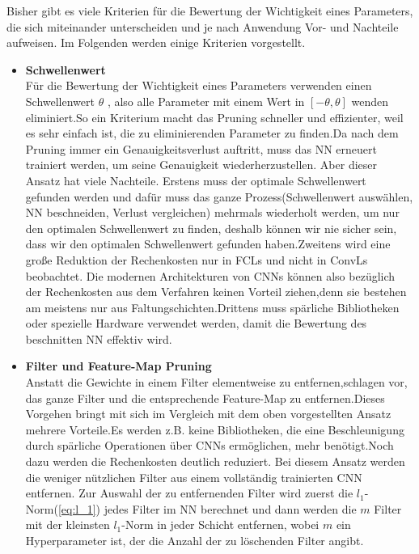 \documentclass[12pt,a4paper]{scrartcl}
\numberwithin{equation}{section}
\begin{document}
Bisher gibt es viele Kriterien für die Bewertung der Wichtigkeit eines Parameters, die sich miteinander unterscheiden und je nach Anwendung Vor- und Nachteile aufweisen. Im Folgenden werden einige Kriterien vorgestellt.
\begin{itemize}
		\item \textbf{Schwellenwert}\\
			Für die Bewertung der Wichtigkeit eines Parameters verwenden \cite[Han et al]{pruning} einen Schwellenwert $ \theta $ , also alle Parameter mit einem Wert in $ [-\theta, \theta] $ wenden eliminiert.So ein Kriterium macht das Pruning schneller und effizienter, weil es sehr einfach ist, die zu eliminierenden Parameter zu finden.Da nach dem Pruning immer ein Genauigkeitsverlust auftritt, muss das \ac{NN} erneuert trainiert werden, um seine Genauigkeit wiederherzustellen. Aber dieser Ansatz hat viele Nachteile. Erstens muss der optimale Schwellenwert gefunden werden und dafür muss das ganze Prozess(Schwellenwert auswählen, \ac{NN} beschneiden, Verlust vergleichen) mehrmals wiederholt werden, um nur den optimalen Schwellenwert zu finden, deshalb können wir nie sicher sein, dass wir den optimalen Schwellenwert gefunden haben.Zweitens wird eine  große Reduktion der Rechenkosten nur in \acsp{FCL} und nicht in \acsp{ConvL} beobachtet\cite{Filter Pruning}. Die modernen Architekturen von \acsp{CNN} können also bezüglich der Rechenkosten aus dem Verfahren keinen Vorteil ziehen,denn sie bestehen am meistens nur aus Faltungschichten.Drittens muss spärliche Bibliotheken oder spezielle Hardware verwendet werden, damit die Bewertung des beschnitten \ac{NN} effektiv wird.
	
	\item \textbf{Filter und Feature-Map Pruning}\\
	Anstatt die Gewichte in einem Filter elementweise zu entfernen,schlagen \cite[Li et al]{Filter Pruning} vor, das ganze Filter und die entsprechende Feature-Map zu entfernen.Dieses Vorgehen bringt mit sich im Vergleich mit dem oben vorgestellten Ansatz mehrere Vorteile.Es werden z.B. keine Bibliotheken, die eine Beschleunigung durch spärliche Operationen über \acsp{CNN} ermöglichen, mehr benötigt.Noch dazu werden die Rechenkosten deutlich reduziert. Bei diesem Ansatz werden die weniger nützlichen Filter aus einem vollständig trainierten \ac{CNN}  entfernen. Zur Auswahl der zu entfernenden Filter wird zuerst die $ l_1$-Norm(\ref{eq:l_1}) jedes Filter im \ac{NN} berechnet und dann werden die $ m $ Filter mit der kleinsten $ l_1 $-Norm in jeder Schicht entfernen, wobei $ m $ ein Hyperparameter ist, der die Anzahl der zu löschenden Filter angibt.
	

\end{itemize}
\end{document}

